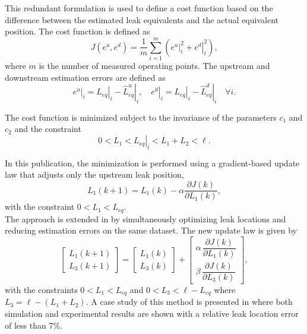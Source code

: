 This redundant formulation is used to define a cost function based on the difference between the estimated leak equivalents and the actual equivalent position. The cost function is defined as
\begin{equation*}
J(e^u,e^d) =
\frac{1}{m}
\sum_{i=1}^{m}
\left(
\left.e^u\right\vert_i^2 + \left.e^d\right\vert_i^2
\right),
\end{equation*}
where $m$ is the number of measured operating points. The upstream and downstream estimation errors are defined as
\begin{equation*}
\left.e^u\right\vert_i = \left.L_{eq}\right\vert_i - \left.\hat{L}^{u}_{eq}\right\vert_i,
\quad \left.e^d\right\vert_i = \left.L_{eq}\right\vert_i - \left.\hat{L}^{d}_{eq}\right\vert_i
\quad \forall i.
\end{equation*}

The cost function is minimized subject to the invariance of the parameters $c_1$ and $c_2$ and the constraint
\begin{equation*}
0 < L_1 < \left.L_{eq}\right\vert_i < L_1 + L_2 < \ell.
\end{equation*}

In this publication, the minimization is performed using a gradient-based update law that adjusts only the upstream leak position,
\begin{equation*}
L_1(k+1) =
L_1(k) -
\alpha
\frac{\partial J(k)}{\partial L_1(k)},
\end{equation*}
with the constraint $0 < L_1 < L_{eq}$. \\

The approach is extended in \cite{peralta2024} by simultaneously optimizing leak locations and reducing estimation errors on the same dataset. The new update law is given by
\begin{equation*}
\begin{bmatrix}
L_{1}(k+1) \\
L_{3}(k+1)
\end{bmatrix}
=
\begin{bmatrix}
L_{1}(k) \\
L_{3}(k)
\end{bmatrix}
+
\begin{bmatrix}
\alpha \, \dfrac{\partial J(k)}{\partial L_1(k)} \\
\beta \, \dfrac{\partial J(k)}{\partial L_3(k)}
\end{bmatrix},
\end{equation*}
with the constraints $0 < L_{1} < {L}_{eq}$ and $0 < L_{3} < \ell - {L}_{eq}$ where $L_3 = \ell- (L_1 + L_2)$. A case study of this method is presented in \cite{peralta2025} where both simulation and experimental results are shown with a relative leak location error of less than 7\%.\\

